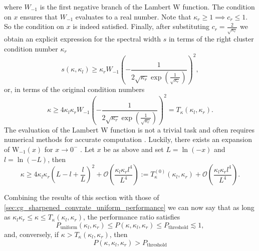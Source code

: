 where $W_{-1}$ is the first negative branch of the Lambert $\mathrm{W}$ function. The condition on $x$ ensures that $W_{-1}$ evaluates to a real number. Note that $\kappa_r\geq1 \implies c_r \leq 1$. So the condition on $x$ is indeed satisfied. Finally, after substituting $c_r = \frac{2}{\sqrt{\kappa_r}}$ we obtain an explicit expression for the spectral width $s$ in terms of the right cluster condition number $\kappa_r$
\[
    s(\kappa, \kappa_l) \geq \kappa_r W_{-1}\left(-\frac{1}{2\sqrt{\kappa_r}\exp\left(\frac{1}{\sqrt{\kappa_r}}\right)}\right)^2,
\]
or, in terms of the original condition numbers
\begin{equation}
    \kappa \geq 4\kappa_l\kappa_r W_{-1}\left(-\frac{1}{2\sqrt{\kappa_r}\exp\left(\frac{1}{\sqrt{\kappa_r}}\right)}\right)^2 = T_{\kappa}(\kappa_l, \kappa_r).
    \label{eq:threshold_inequality_explicit}    
\end{equation}
The evaluation of the Lambert $\mathrm{W}$ function is not a trivial task and often requires numerical methods for accurate computation \cite{evaluation_of_the_lambert_w_function_Corless1996}. Luckily, there exists an expansion of $\mathrm{W}_{-1}(x)$ for $x\rightarrow0^-$ \cite[Equation 4.19]{evaluation_of_the_lambert_w_function_Corless1996}. Let $x$ be as above and set $L = \ln(-x)$ and $l = \ln(-L)$, then
\begin{equation}
    \kappa \geq 4\kappa_l\kappa_r \left(L - l + \frac{l}{L}\right)^2 + \mathcal{O}\left(\frac{\kappa_l\kappa_rl^4}{L^4}\right) := T^{(0)}_{\kappa}(\kappa_l, \kappa_r) + \mathcal{O}\left(\frac{\kappa_l\kappa_rl^4}{L^4}\right).
    \label{eq:threshold_inequality_explicit_expansion}    
\end{equation}

Combining the results of this section with those of \cref{sec:cg_sharpened_convrate_uniform_performance} we can now say that as long as $\kappa_l\kappa_r \leq \kappa \leq T_{\kappa}(\kappa_l, \kappa_r)$, the performance ratio satisfies
\begin{equation}
    P_{\text{uniform}}(\kappa_l, \kappa_r) \leq P(\kappa, \kappa_l, \kappa_r) \leq P_{\text{threshold}} \lesssim 1,
    \label{eq:performance_bounds}
\end{equation}
and, conversely, if $\kappa > T_{\kappa}(\kappa_l, \kappa_r)$, then 
\[
    P(\kappa, \kappa_l, \kappa_r) > P_{\text{threshold}}
\]


